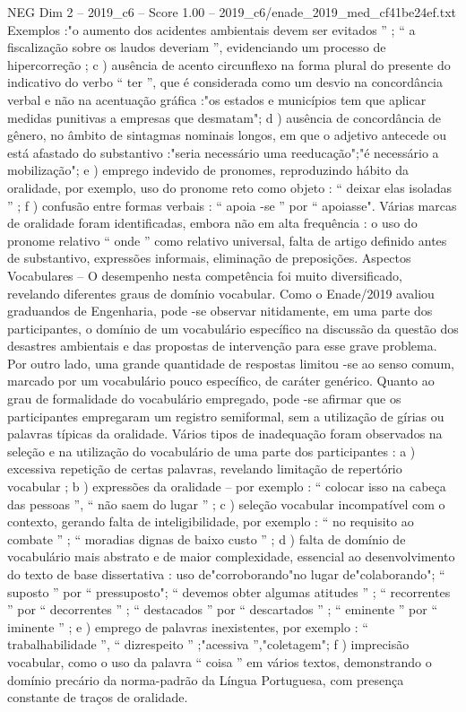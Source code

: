 \begin{textsample}{NEG Dim 2 – 2019\_c6 – Score 1.00 – 2019\_c6/enade\_2019\_med\_cf41be24ef.txt}
Exemplos :"o aumento dos acidentes ambientais devem ser evitados ” ; “ a fiscalização sobre os laudos deveriam ”, evidenciando um processo de hipercorreção ; c ) ausência de acento circunflexo na forma plural do presente do indicativo do verbo “ ter ”, que é considerada como um desvio na concordância verbal e não na acentuação gráfica :"os estados e municípios tem que aplicar medidas punitivas a empresas que desmatam"; d ) ausência de concordância de gênero, no âmbito de sintagmas nominais longos, em que o adjetivo antecede ou está afastado do substantivo :"seria necessário uma reeducação";"é necessário a mobilização"; e ) emprego indevido de pronomes, reproduzindo hábito da oralidade, por exemplo, uso do pronome reto como objeto : “ deixar elas isoladas ” ; f ) confusão entre formas verbais : “ apoia -se ” por “ apoiasse".
Várias marcas de oralidade foram identificadas, embora não em alta frequência : o uso do pronome relativo “ onde ” como relativo universal, falta de artigo definido antes de substantivo, expressões informais, eliminação de preposições.
Aspectos Vocabulares – O desempenho nesta competência foi muito diversificado, revelando diferentes graus de domínio vocabular.
Como o Enade/2019 avaliou graduandos de Engenharia, pode -se observar nitidamente, em uma parte dos participantes, o domínio de um vocabulário específico na discussão da questão dos desastres ambientais e das propostas de intervenção para esse grave problema.
Por outro lado, uma grande quantidade de respostas limitou -se ao senso comum, marcado por um vocabulário pouco específico, de caráter genérico.
Quanto ao grau de formalidade do vocabulário empregado, pode -se afirmar que os participantes empregaram um registro semiformal, sem a utilização de gírias ou palavras típicas da oralidade.
Vários tipos de inadequação foram observados na seleção e na utilização do vocabulário de uma parte dos participantes : a ) excessiva repetição de certas palavras, revelando limitação de repertório vocabular ; b ) expressões da oralidade – por exemplo : “ colocar isso na cabeça das pessoas ”, “ não saem do lugar ” ; c ) seleção vocabular incompatível com o contexto, gerando falta de inteligibilidade, por exemplo : “ no requisito ao combate ” ; “ moradias dignas de baixo custo ” ; d ) falta de domínio de vocabulário mais abstrato e de maior complexidade, essencial ao desenvolvimento do texto de base dissertativa : uso de"corroborando"no lugar de"colaborando"; “ suposto ” por “ pressuposto"; “ devemos obter algumas atitudes ” ; “ recorrentes ” por “ decorrentes ” ; “ destacados ” por “ descartados ” ; “ eminente ” por “ iminente ” ; e ) emprego de palavras inexistentes, por exemplo : “ trabalhabilidade ”, “ dizrespeito ” ;"acessiva ”,"coletagem"; f ) imprecisão vocabular, como o uso da palavra “ coisa ” em vários textos, demonstrando o domínio precário da norma-padrão da Língua Portuguesa, com presença constante de traços de oralidade.

\end{textsample}
